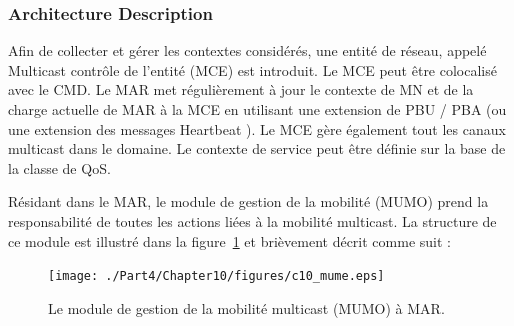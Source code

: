 \subsubsection{Architecture Description}
Afin de collecter et gérer les contextes considérés, une entité de réseau, appelé Multicast contrôle de l'entité (MCE) est introduit. Le MCE peut être colocalisé avec le CMD. Le MAR met régulièrement à jour le contexte de MN et de la charge actuelle de MAR à la MCE en utilisant une extension de PBU / PBA (ou une extension des messages Heartbeat \cite{heartbeat}). Le MCE gère également tout les canaux multicast dans le domaine. Le contexte de service peut être définie sur la base de la classe de QoS.

Résidant dans le MAR, le module de gestion de la mobilité (MUMO) prend la responsabilité de toutes les actions liées à la mobilité multicast. La structure de ce module est illustré dans la figure~\ref{fig:multicast_module} et brièvement décrit comme suit :

\begin{figure}[t!]
 	\begin{center} 
		\texttt{[image: ./Part4/Chapter10/figures/c10\_mume.eps]}
		\caption{Le module de gestion de la mobilité multicast (MUMO) à MAR.}
		\label{fig:multicast_module}
	\end{center}
\end{figure}

